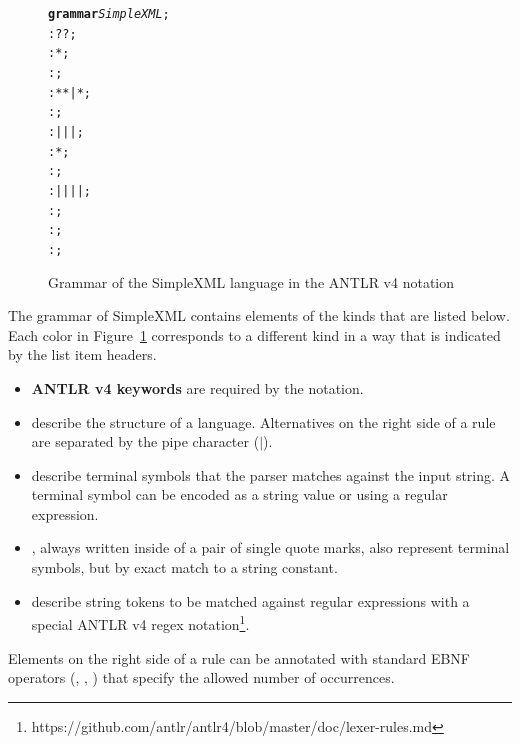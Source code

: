 \begin{figure}[ht]
\centering
\begin{framed}
\begin{alltt}
\small
\textbf{grammar} \textit{SimpleXML};
  : ? ?  ;
    :  *  ;
   : \antlrliteral{<!--}  \antlrliteral{-->} ;
   : \antlrliteral{<}  * \antlrliteral{>} * \antlrliteral{</}  \antlrliteral{>} | \antlrliteral{<}  * \antlrliteral{/>} ;
    :     ;
   :  |  |  |  ;
      :  * ;
     : \antlrregex{[0-9]} ;
  :  | \antlrliteral{-} | \antlrliteral{\_} |  |  ;
 : \antlrregex{[:a-zA-Z]} ;
      : \antlrregex{~[<"]*} ;
     : \antlrliteral{<![CDATA[}  \antlrliteral{]]>} ;
\end{alltt}
\end{framed}
\caption{Grammar of the SimpleXML language in the ANTLR v4 notation}
\label{fig:SIMPLEXML}
\end{figure}

The grammar of SimpleXML contains elements of the kinds that are listed below.
Each color in Figure~\ref{fig:SIMPLEXML} corresponds to a different kind in a way that is indicated by the list item headers.
\begin{itemize}
	\item \textbf{ANTLR v4 keywords} are required by the notation.
	\item {} describe the structure of a language.
		Alternatives on the right side of a rule are separated by the pipe character ($|$).
	\item {} describe terminal symbols that the parser matches against the input string.
		A terminal symbol can be encoded as a string value or using a regular expression.
	\item {}, always written inside of a pair of single quote marks, also represent terminal symbols, but by exact match to a string constant.
	\item {} describe string tokens to be matched against regular expressions with a special ANTLR v4 regex notation\footnote{https://github.com/antlr/antlr4/blob/master/doc/lexer-rules.md}.
\end{itemize}
Elements on the right side of a rule can be annotated with standard EBNF operators (, \code{+}, \code{*}) that specify the allowed number of occurrences.

